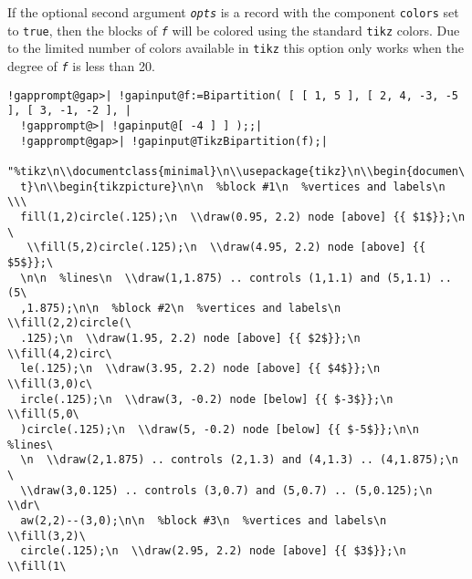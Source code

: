 \documentclass[a4paper,11pt]{report}
\begin{document}
{{{ If the optional second argument \mbox{\texttt{\mdseries\slshape opts}} is a record with the component \texttt{colors} set to \texttt{true}, then the blocks of \mbox{\texttt{\mdseries\slshape f}} will be colored using the standard \texttt{tikz} colors. Due to the limited number of colors available in \texttt{tikz} this option only works when the degree of \mbox{\texttt{\mdseries\slshape f}} is less than 20. 
\begin{Verbatim}[commandchars=!@|,fontsize=\small,frame=single,label=Example]
  !gapprompt@gap>| !gapinput@f:=Bipartition( [ [ 1, 5 ], [ 2, 4, -3, -5 ], [ 3, -1, -2 ], |
  !gapprompt@>| !gapinput@[ -4 ] ] );;|
  !gapprompt@gap>| !gapinput@TikzBipartition(f);|
  "%tikz\n\\documentclass{minimal}\n\\usepackage{tikz}\n\\begin{documen\
  t}\n\\begin{tikzpicture}\n\n  %block #1\n  %vertices and labels\n  \\\
  fill(1,2)circle(.125);\n  \\draw(0.95, 2.2) node [above] {{ $1$}};\n \
   \\fill(5,2)circle(.125);\n  \\draw(4.95, 2.2) node [above] {{ $5$}};\
  \n\n  %lines\n  \\draw(1,1.875) .. controls (1,1.1) and (5,1.1) .. (5\
  ,1.875);\n\n  %block #2\n  %vertices and labels\n  \\fill(2,2)circle(\
  .125);\n  \\draw(1.95, 2.2) node [above] {{ $2$}};\n  \\fill(4,2)circ\
  le(.125);\n  \\draw(3.95, 2.2) node [above] {{ $4$}};\n  \\fill(3,0)c\
  ircle(.125);\n  \\draw(3, -0.2) node [below] {{ $-3$}};\n  \\fill(5,0\
  )circle(.125);\n  \\draw(5, -0.2) node [below] {{ $-5$}};\n\n  %lines\
  \n  \\draw(2,1.875) .. controls (2,1.3) and (4,1.3) .. (4,1.875);\n  \
  \\draw(3,0.125) .. controls (3,0.7) and (5,0.7) .. (5,0.125);\n  \\dr\
  aw(2,2)--(3,0);\n\n  %block #3\n  %vertices and labels\n  \\fill(3,2)\
  circle(.125);\n  \\draw(2.95, 2.2) node [above] {{ $3$}};\n  \\fill(1\

\end{Verbatim}}}}
\end{document}
